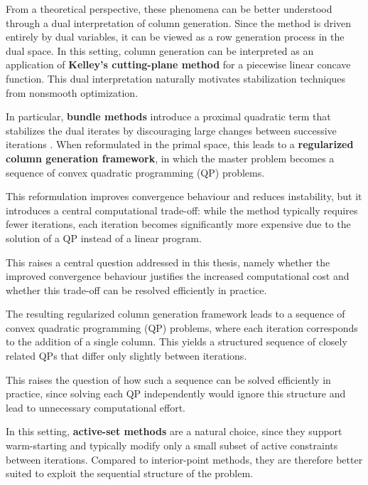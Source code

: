 \documentclass{book}
\theoremstyle{definition}
\numberwithin{algorithm_}{chapter}
\begin{document}
From a theoretical perspective, these phenomena can be better understood through a dual interpretation of column generation. 
Since the method is driven entirely by dual variables, it can be viewed as a row generation process in the dual space. 
In this setting, column generation can be interpreted as an application of \textbf{Kelley’s cutting-plane method} \cite{Kelley1960} for a piecewise linear concave function. 
This dual interpretation naturally motivates stabilization techniques from nonsmooth optimization.

In particular, \textbf{bundle methods} introduce a proximal quadratic term that stabilizes the dual iterates by discouraging large changes between successive iterations \cite{hiriarturruty1993convex, lemarechal1995new, kiwiel1990proximity}. 
When reformulated in the primal space, this leads to a \textbf{regularized column generation framework}, in which the master problem becomes a sequence of convex quadratic programming (QP) problems.

This reformulation improves convergence behaviour and reduces instability, but it introduces a central computational trade-off: while the method typically requires fewer iterations, each iteration becomes significantly more expensive due to the solution of a QP instead of a linear program.

This raises a central question addressed in this thesis, namely whether the improved convergence behaviour justifies the increased computational cost and whether this trade-off can be resolved efficiently in practice.

\bigskip

The resulting regularized column generation framework leads to a sequence of convex quadratic programming (QP) problems, where each iteration corresponds to the addition of a single column. 
This yields a structured sequence of closely related QPs that differ only slightly between iterations.

This raises the question of how such a sequence can be solved efficiently in practice, since solving each QP independently would ignore this structure and lead to unnecessary computational effort.

In this setting, \textbf{active-set methods} are a natural choice, since they support warm-starting and typically modify only a small subset of active constraints between iterations. 
Compared to interior-point methods, they are therefore better suited to exploit the sequential structure of the problem.
\end{document}
